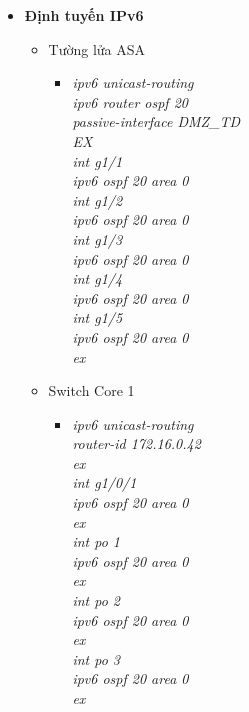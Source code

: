 \documentclass[a4paper, 12pt]{article}
\begin{document}
\begin{itemize}
       \item \textbf{Định tuyến IPv6}
      \begin{itemize}
        \item Tường lửa ASA 
        \begin{itemize}
          \item \textit{ipv6 unicast-routing\\
                    	ipv6 router ospf 20\\
                        passive-interface DMZ\_TD\\
                        EX\\
                        int g1/1\\
                        ipv6 ospf 20 area 0\\
                        int g1/2\\
                        ipv6 ospf 20 area 0\\
                        int g1/3\\
                        ipv6 ospf 20 area 0\\
                        int g1/4\\
                        ipv6 ospf 20 area 0\\
                        int g1/5\\
                        ipv6 ospf 20 area 0\\
                        ex\\}
       
        \end{itemize}
       
            \item Switch Core 1
           
        \begin{itemize}
         \item \textit{ipv6 unicast-routing\\
                       router-id 172.16.0.42\\
                        ex\\
                        int g1/0/1\\
                        ipv6 ospf 20 area 0\\
                        ex\\
                        int po 1\\
                        ipv6 ospf 20 area 0\\
                        ex\\
                        int po 2\\
                        ipv6 ospf 20 area 0\\
                        ex\\
                        int po 3\\
                        ipv6 ospf 20 area 0\\
                        ex\\
                       }
        

\end{itemize}
\end{itemize}
\end{itemize}
\end{document}
